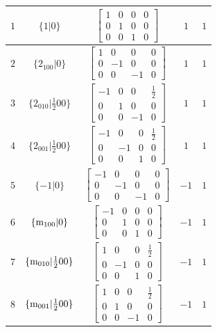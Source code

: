 \documentclass[fleqn,8pt]{jsarticle}
\begin{document}
\begin{longtable}{ccccc}
$ 1 $ & $ \{1|0\} $ & $ \begin{bmatrix} 1 & 0 & 0 & 0 \\ 0 & 1 & 0 & 0 \\ 0 & 0 & 1 & 0 \end{bmatrix} $ & $ 1 $ & $ 1 $ \\ \hline
$ 2 $ & $ \{2{}_{100}|0\} $ & $ \begin{bmatrix} 1 & 0 & 0 & 0 \\ 0 & -1 & 0 & 0 \\ 0 & 0 & -1 & 0 \end{bmatrix} $ & $ 1 $ & $ 1 $ \\ \hline
$ 3 $ & $ \{2{}_{010}|\frac{1}{2} 0 0\} $ & $ \begin{bmatrix} -1 & 0 & 0 & \frac{1}{2} \\ 0 & 1 & 0 & 0 \\ 0 & 0 & -1 & 0 \end{bmatrix} $ & $ 1 $ & $ 1 $ \\ \hline
$ 4 $ & $ \{2{}_{001}|\frac{1}{2} 0 0\} $ & $ \begin{bmatrix} -1 & 0 & 0 & \frac{1}{2} \\ 0 & -1 & 0 & 0 \\ 0 & 0 & 1 & 0 \end{bmatrix} $ & $ 1 $ & $ 1 $ \\ \hline
$ 5 $ & $ \{-1|0\} $ & $ \begin{bmatrix} -1 & 0 & 0 & 0 \\ 0 & -1 & 0 & 0 \\ 0 & 0 & -1 & 0 \end{bmatrix} $ & $ -1 $ & $ 1 $ \\ \hline
$ 6 $ & $ \{{\rm m}_{100}|0\} $ & $ \begin{bmatrix} -1 & 0 & 0 & 0 \\ 0 & 1 & 0 & 0 \\ 0 & 0 & 1 & 0 \end{bmatrix} $ & $ -1 $ & $ 1 $ \\ \hline
$ 7 $ & $ \{{\rm m}_{010}|\frac{1}{2} 0 0\} $ & $ \begin{bmatrix} 1 & 0 & 0 & \frac{1}{2} \\ 0 & -1 & 0 & 0 \\ 0 & 0 & 1 & 0 \end{bmatrix} $ & $ -1 $ & $ 1 $ \\ \hline
$ 8 $ & $ \{{\rm m}_{001}|\frac{1}{2} 0 0\} $ & $ \begin{bmatrix} 1 & 0 & 0 & \frac{1}{2} \\ 0 & 1 & 0 & 0 \\ 0 & 0 & -1 & 0 \end{bmatrix} $ & $ -1 $ & $ 1 $ \\ \hline

\end{longtable}
\end{document}

